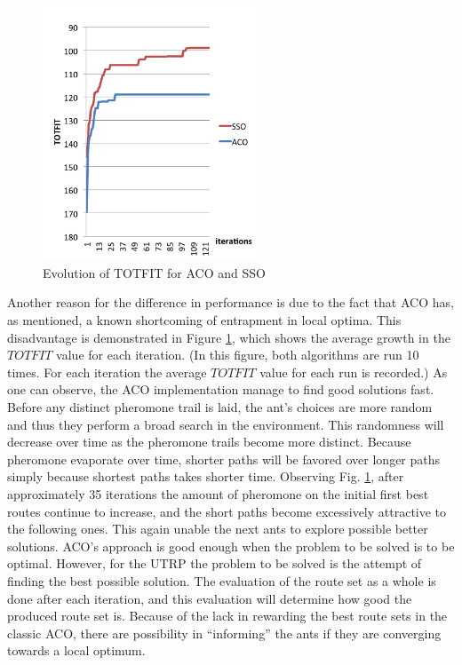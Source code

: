  \begin{figure}[H]
    \begin{center}
    \includegraphics[width=2.5in]{assets/acovsssoNEW.png}
    \end{center}
    \caption{Evolution of TOTFIT for ACO and SSO }
    \label{fig:acovssso} 
\end{figure}

Another reason for the difference in performance is due to the fact that ACO has, as mentioned, a known shortcoming of entrapment in local optima. This disadvantage is demonstrated in Figure \ref{fig:acovssso}, which shows the average growth in the $TOTFIT$ value for each iteration. (In this figure, both algorithms are run 10 times. For each iteration the average $TOTFIT$ value for each run is recorded.) As one can observe, the ACO implementation manage to find good solutions fast. Before any distinct pheromone trail is laid, the ant's choices are more random and thus they perform a broad search in the environment. This randomness will decrease over time as the pheromone trails become more distinct. Because pheromone evaporate over time, shorter paths will be favored over longer paths simply because shortest paths takes shorter time. Observing Fig. \ref{fig:acovssso}, after approximately 35 iterations the amount of pheromone on the initial first best routes continue to increase, and the short paths become excessively attractive to the following ones. This again unable the next ants to explore possible better solutions. ACO's approach is good enough when the problem to be solved is to be optimal. However, for the UTRP the problem to be solved is the attempt of finding the best possible solution. The evaluation of the route set as a whole is done after each iteration, and this evaluation will determine how good the produced route set is. Because of the lack in rewarding the best route sets in the classic ACO, there are possibility in ``informing'' the ants if they are converging towards a local optimum.

